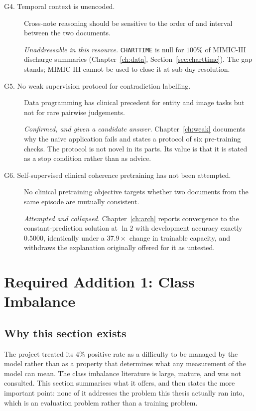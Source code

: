 \begin{description}
\item[G4. Temporal context is unencoded.] Cross-note reasoning should be
      sensitive to the order of and interval between the two documents.

      \textit{Unaddressable in this resource.} \texttt{CHARTTIME} is null for
      $100\%$ of MIMIC-III discharge summaries (Chapter~\ref{ch:data},
      Section~\ref{sec:charttime}). The gap stands; MIMIC-III cannot be used to
      close it at sub-day resolution.

\item[G5. No weak supervision protocol for contradiction labelling.] Data
      programming has clinical precedent for entity and image tasks but not for
      rare pairwise judgements.

      \textit{Confirmed, and given a candidate answer.} Chapter~\ref{ch:weak}
      documents why the naive application fails and states a protocol of six
      pre-training checks. The protocol is not novel in its parts. Its value is
      that it is stated as a stop condition rather than as advice.

\item[G6. Self-supervised clinical coherence pretraining has not been
      attempted.] No clinical pretraining objective targets whether two
      documents from the same episode are mutually consistent.

      \textit{Attempted and collapsed.} Chapter~\ref{ch:arch} reports
      convergence to the constant-prediction solution at $\ln 2$ with
      development accuracy exactly $0.5000$, identically under a $37.9\times$
      change in trainable capacity, and withdraws the explanation originally
      offered for it as untested.
\end{description}

\section{Required Addition 1: Class Imbalance}
\label{sec:bg-imbalance}

\subsection{Why this section exists}

The project treated its $4\%$ positive rate as a difficulty to be managed by the
model rather than as a property that determines what any measurement of the
model can mean. The class imbalance literature is large, mature, and was not
consulted. This section summarises what it offers, and then states the more
important point: none of it addresses the problem this thesis actually ran into,
which is an evaluation problem rather than a training problem.

